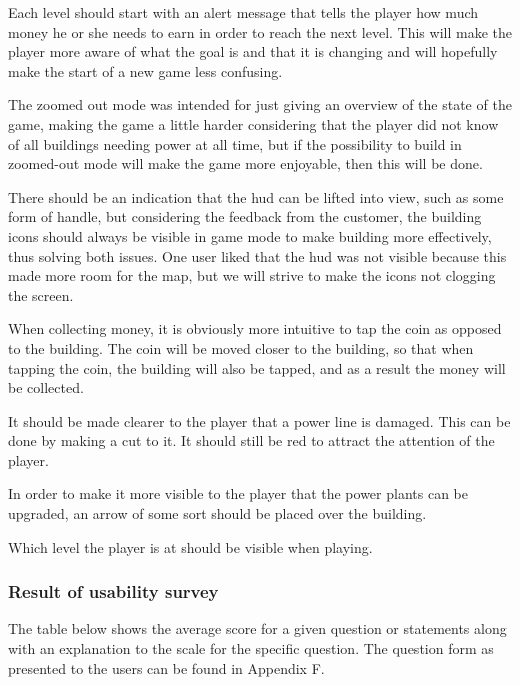 	Each level should start with an alert message that tells the player how much money he or she needs to earn in order to reach the next level. This will make the player more aware of what the goal is and that it is changing and will hopefully make the start of a new game less confusing.

	The zoomed out mode was intended for just giving an overview of the state of the game, making the game a little harder considering that the player did not know of all buildings needing power at all time, but if the possibility to build in zoomed-out mode will make the game more enjoyable, then this will be done.

	There should be an indication that the hud can be lifted into view, such as some form of handle, but considering the feedback from the customer, the building icons should always be visible in game mode to make building more effectively, thus solving both issues. One user liked that the hud was not visible because this made more room for the map, but we will strive to make the icons not clogging the screen.

	When collecting money, it is obviously more intuitive to tap the coin as opposed to the building. The coin will be moved closer to the building, so that when tapping the coin, the building will also be tapped, and as a result the money will be collected.

	It should be made clearer to the player that a power line is damaged. This can be done by making a cut to it. It should still be red to attract the attention of the player.

	In order to make it more visible to the player that the power plants can be upgraded, an arrow of some sort should be placed over the building.

	Which level the player is at should be visible when playing.

	\subsubsection*{Result of usability survey}

	The table below shows the average score for a given question or statements along with an explanation to the scale for the specific question. The question form as presented to the users can be found in Appendix F.

